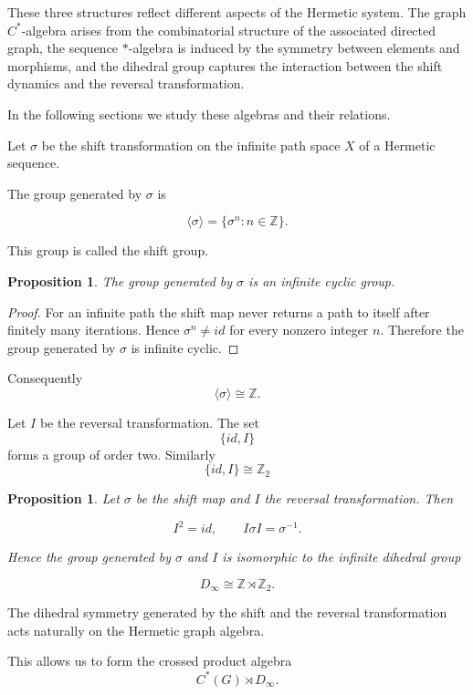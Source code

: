 \documentclass[11pt]{book}
\theoremstyle{definition}
\theoremstyle{plain}
\newtheorem{proposition}[theorem]{Proposition}
\theoremstyle{remark}
\begin{document}
These three structures reflect different aspects of the
Hermetic system. The graph $C^*$-algebra arises from the
combinatorial structure of the associated directed graph,
the sequence $*$-algebra is induced by the symmetry
between elements and morphisms, and the dihedral group
captures the interaction between the shift dynamics and
the reversal transformation.

In the following sections we study these algebras and
their relations.

Let $\sigma$ be the shift transformation on the infinite
path space $X$ of a Hermetic sequence.

The group generated by $\sigma$ is

\[
\langle \sigma \rangle
=
\{\sigma^n : n\in\mathbb Z\}.
\]

This group is called the shift group.

\begin{proposition}
The group generated by $\sigma$ is an infinite cyclic group.
\end{proposition}

\begin{proof}
For an infinite path the shift map never returns a path
to itself after finitely many iterations. Hence
$\sigma^n\neq id$ for every nonzero integer $n$.
Therefore the group generated by $\sigma$ is infinite
cyclic.
\end{proof}

Consequently
\[
\langle\sigma\rangle \cong \mathbb Z .
\]

Let $I$ be the reversal transformation.
The set
\[
\{id,I\}
\]
forms a group of order two.
Similarly
\[
\{id,I\} \cong \mathbb{Z}_2
\]

\begin{proposition}
Let $\sigma$ be the shift map and $I$ the reversal
transformation. Then

\[
I^2 = id,
\qquad
I\sigma I = \sigma^{-1}.
\]

Hence the group generated by $\sigma$ and $I$
is isomorphic to the infinite dihedral group

\[
D_\infty \cong
\mathbb Z \rtimes \mathbb Z_2 .
\]
\end{proposition}

The dihedral symmetry generated by the shift
and the reversal transformation acts naturally
on the Hermetic graph algebra.

This allows us to form the crossed product
algebra
\[
C^*(G)\rtimes D_\infty .
\]
\end{document}

